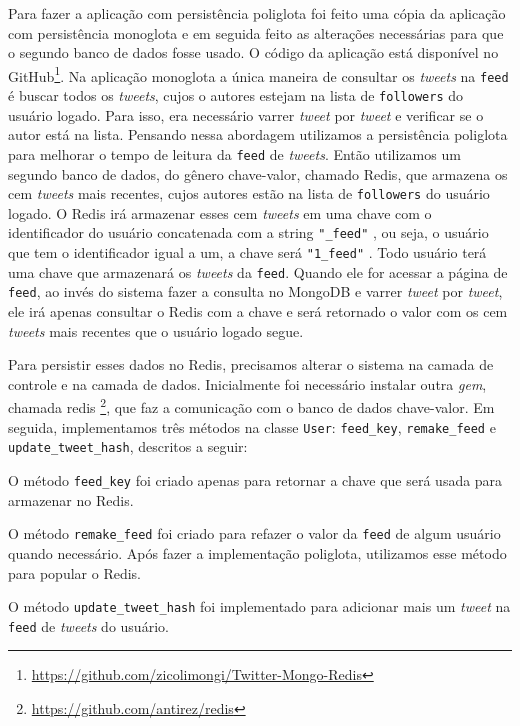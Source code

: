 Para fazer a aplicação com persistência poliglota foi feito uma cópia da aplicação com persistência monoglota e em seguida feito as alterações necessárias para que o segundo banco de dados fosse usado. O código da aplicação está disponível no GitHub\footnote{\url{https://github.com/zicolimongi/Twitter-Mongo-Redis}}.
Na aplicação monoglota a única maneira de consultar os \textit{tweets} na \verb|feed| é buscar todos os \textit{tweets}, cujos o autores estejam na lista de \verb|followers| do usuário logado. Para isso, era necessário varrer \textit{tweet} por \textit{tweet} e verificar se o autor está na lista. Pensando nessa abordagem utilizamos a persistência poliglota para melhorar o tempo de leitura da \verb|feed| de \textit{tweets}.
Então utilizamos um segundo banco de dados, do gênero chave-valor, chamado \ac{Redis}, que armazena os cem \textit{tweets} mais recentes, cujos autores estão na lista de \verb|followers| do usuário logado.
O \ac{Redis} irá armazenar esses cem \textit{tweets} em uma chave com o identificador do usuário concatenada com a string \verb|"_feed"| , ou seja, o usuário que tem o identificador igual a um, a chave será \verb|"1_feed"| . Todo usuário terá uma chave que armazenará os \textit{tweets} da \verb|feed|. Quando ele for acessar a página de \verb|feed|, ao invés do sistema fazer a consulta no MongoDB e varrer \textit{tweet} por \textit{tweet}, ele irá apenas consultar o \ac{Redis} com a chave e será retornado o valor com os cem \textit{tweets} mais recentes que o usuário logado segue.


Para persistir esses dados no \ac{Redis}, precisamos alterar o sistema na camada de controle e na camada de dados. Inicialmente foi necessário instalar outra \textit{gem}, chamada redis \footnote{\url{https://github.com/antirez/redis}}, que faz a comunicação com o banco de dados chave-valor. Em seguida, implementamos três métodos na classe \verb|User|: \verb|feed_key|, \verb|remake_feed| e \verb|update_tweet_hash|, descritos a seguir:

O método \verb|feed_key| foi criado apenas para retornar a chave que será usada para armazenar no \ac{Redis}.

O método \verb|remake_feed| foi criado para refazer o valor da \verb|feed| de algum usuário quando necessário. Após fazer a implementação poliglota, utilizamos esse método para popular o \ac{Redis}.

O método \verb|update_tweet_hash| foi implementado para adicionar mais um \textit{tweet} na \verb|feed| de \textit{tweets} do usuário.

